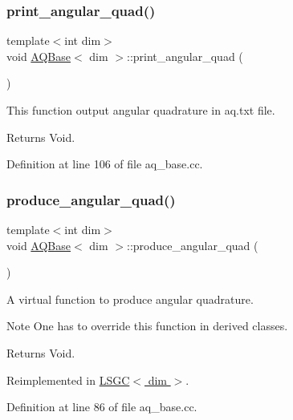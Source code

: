 \subsubsection{\texorpdfstring{print\+\_\+angular\+\_\+quad()}{print\_angular\_quad()}}
{\footnotesize\ttfamily template$<$int dim$>$ \\
void \hyperlink{class_a_q_base}{A\+Q\+Base}$<$ dim $>$\+::print\+\_\+angular\+\_\+quad (\begin{DoxyParamCaption}{ }\end{DoxyParamCaption})}

This function output angular quadrature in aq.\+txt file.

\begin{DoxyReturn}{Returns}
Void. 
\end{DoxyReturn}


Definition at line 106 of file aq\+\_\+base.\+cc.

\mbox{\label{class_a_q_base_a16c7871be0da6c112f547f39d50258fd}} 
\subsubsection{\texorpdfstring{produce\+\_\+angular\+\_\+quad()}{produce\_angular\_quad()}}
{\footnotesize\ttfamily template$<$int dim$>$ \\
void \hyperlink{class_a_q_base}{A\+Q\+Base}$<$ dim $>$\+::produce\+\_\+angular\+\_\+quad (\begin{DoxyParamCaption}{ }\end{DoxyParamCaption})\hspace{0.3cm}{\ttfamily [virtual]}}

A virtual function to produce angular quadrature.

\begin{DoxyNote}{Note}
One has to override this function in derived classes. 
\end{DoxyNote}
\begin{DoxyReturn}{Returns}
Void. 
\end{DoxyReturn}


Reimplemented in \hyperlink{class_l_s_g_c_a1d135fb9ca12a9b65b8cc397479fc4d7}{L\+S\+G\+C$<$ dim $>$}.



Definition at line 86 of file aq\+\_\+base.\+cc.

